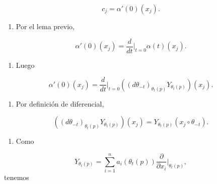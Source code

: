 \begin{bookproof}{}
\[
c_j=\alpha'(0)(x_j).
\]
\begin{enumerate}[start=15]
\item Por el lema previo,
\end{enumerate}
\[
\alpha'(0)(x_j)=\frac{d}{dt}\bigg|_{t=0}\alpha(t)(x_j).
\]
\begin{enumerate}[start=16]
\item Luego
\end{enumerate}
\[
\alpha'(0)(x_j)=\frac{d}{dt}\bigg|_{t=0}\left((d\theta_{-t})_{\theta_t(p)}Y_{\theta_t(p)}\right)(x_j).
\]
\begin{enumerate}[start=17]
\item Por definición de diferencial,
\end{enumerate}
\[
\left((d\theta_{-t})_{\theta_t(p)}Y_{\theta_t(p)}\right)(x_j)=Y_{\theta_t(p)}(x_j\circ\theta_{-t}).
\]
\begin{enumerate}[start=18]
\item Como
\end{enumerate}
\[
Y_{\theta_t(p)}=\sum_{i=1}^n a_i(\theta_t(p))\frac{\partial}{\partial x_i}\bigg|_{\theta_t(p)},
\]
tenemos


\end{bookproof}
